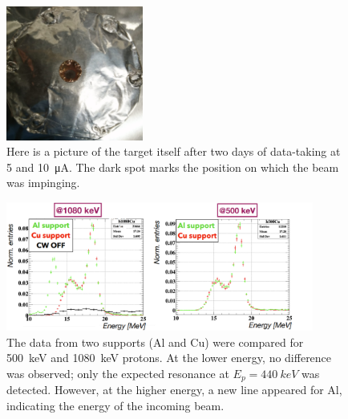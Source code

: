 \begin{refsection}
\begin{figure}
        \includegraphics[width = 0.4\textwidth]{Figures/X17/Dec2023/X17_Dec2023_AlTarget_burned.png}
        \caption[X17: Small LiPON target]{Here is a picture of the target itself after two days of data-taking at 5 and \SI{10}{\micro A}. The dark spot marks the position on which the beam was impinging.}
        \label{fig:X17:target:LiPON:psi:burned}
    \end{figure}       

    \begin{figure}
        \centering
        \includegraphics[width = 0.9\textwidth]{Figures/X17/Dec2023/X172023_Al_Cu.png}
        \caption[X17: Al and Cu support spectra]{The data from two supports (Al and Cu) were compared for \SI{500}{keV} and \SI{1080}{keV} protons. At the lower energy, no difference was observed; only the expected resonance at $E_p=\SI{440}{keV}$ was detected. However, at the higher energy, a new line appeared for Al, indicating the energy of the incoming beam.}
        \label{fig:X17:2023:AlCu}
    \end{figure}



\end{refsection}
